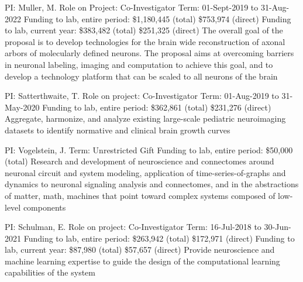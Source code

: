 \documentclass[10pt,colorlinks=true,urlcolor=blue]{moderncv}
\begin{document}
{\newline PI: Muller, M.
\newline Role on Project: Co-Investigator
\newline Term: 01-Sept-2019 to 31-Aug-2022
\newline Funding to lab, entire period: \$1,180,445 (total) \$753,974 (direct) 
\newline Funding to lab, current year: \$383,482 (total) \$251,325 (direct)
\newline The overall goal of the proposal is to develop technologies for the brain wide reconstruction
of axonal arbors of molecularly defined neurons. The proposal aims at overcoming barriers
in neuronal labeling, imaging and computation to achieve this goal, and to develop a
technology platform that can be scaled to all neurons of the brain}{}{}{}

{\newline PI: Satterthwaite, T.
\newline Role on project: Co-Investigator
\newline Term: 01-Aug-2019 to 31-May-2020
\newline Funding to lab, entire period: \$362,861 (total) \$231,276 (direct)
\newline Aggregate, harmonize, and analyze existing large-scale pediatric neuroimaging datasets to
identify normative and clinical brain growth curves}{}{}{}

{\newline PI: Vogelstein, J.
\newline Term: Unrestricted Gift
\newline Funding to lab, entire period: \$50,000 (total)
\newline Research and development of neuroscience and connectomes around neuronal circuit and
system modeling, application of time-series-of-graphs and dynamics to neuronal signaling
analysis and connectomes, and in the abstractions of matter, math, machines that point
toward complex systems composed of low-level components}{}{}{}{}

{\newline PI: Schulman, E.
\newline Role on project: Co-Investigator
\newline Term: 16-Jul-2018 to 30-Jun-2021
\newline Funding to lab, entire period: \$263,942 (total) \$172,971 (direct)
\newline Funding to lab, current year: \$87,980 (total) \$57,657 (direct)
\newline Provide neuroscience and machine learning expertise to guide the design of the
computational learning capabilities of the system}{}{}{}
\end{document}
